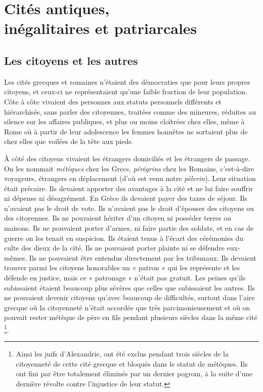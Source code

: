 

\chapter[Cités antiques, inégalitaires et patriarcales]{Cités antiques,\\inégalitaires et patriarcales}

\section{Les citoyens et les autres}
Les cités grecques et romaines n'étaient des démocraties que pour
leurs propres citoyens, et ceux-ci ne représentaient qu'une faible fraction de leur
population. Côte à côte vivaient des personnes aux statuts personnels
différents et hiérarchisés, sans parler des citoyennes, traitées comme des
mineures, réduites au silence sur les affaires publiques, et plus ou moins
cloîtrées chez elles, même à Rome où à partir de leur adolescence les femmes honnêtes ne sortaient plus
de chez elles que voilées de la tête aux pieds.

À côté des citoyens vivaient les étrangers domiciliés et les étrangers
de passage. On les nommait \emph{métèques} chez les Grecs, \emph{pérégrins} chez les
Romains, c'est-à-dire voyageurs, étrangers en déplacement (d'où est venu
notre \emph{pèlerin}). Leur situation était précaire. Ils devaient apporter des avantages
à la cité et ne lui faire souffrir ni dépense ni désagrément. En Grèce
ils devaient payer des taxes de séjour. Ils n'avaient pas le droit de vote. Ils
n'avaient pas le droit d'épouser des citoyens ou des citoyennes. Ils ne
pouvaient hériter d'un citoyen ni posséder terres ou maisons. Ils ne pouvaient
porter d'armes, ni faire partie des soldats, et en cas de guerre on
les tenait en suspicion. Ils étaient tenus à l'écart des cérémonies du culte
des dieux de la cité. Ils ne pouvaient porter plainte ni se défendre eux-mêmes.
Ils ne pouvaient être entendus directement par les tribunaux. Ils
devaient trouver parmi les citoyens honorables un « patron » qui les représente
et les défende en justice, mais ce « patronage » n'était pas gratuit.
Les peines qu'ils subissaient étaient beaucoup plus sévères que celles
que subissaient les autres. Ils ne pouvaient devenir citoyens qu'avec
beaucoup de difficultés, surtout dans l'aire grecque où la citoyenneté n'était accordée que très parcimonieusement et où on pouvait rester
métèque de père en fils pendant plusieurs siècles dans la même cité%
\footnote{Ainsi
les juifs d'Alexandrie, ont été exclus pendant trois siècles de la citoyenneté de cette cité grecque et bloqués dans le statut de métèques. Ils ont fini par être totalement éliminés par un dernier pogrom, à la suite d'une dernière révolte contre l'injustice de leur statut.}.

